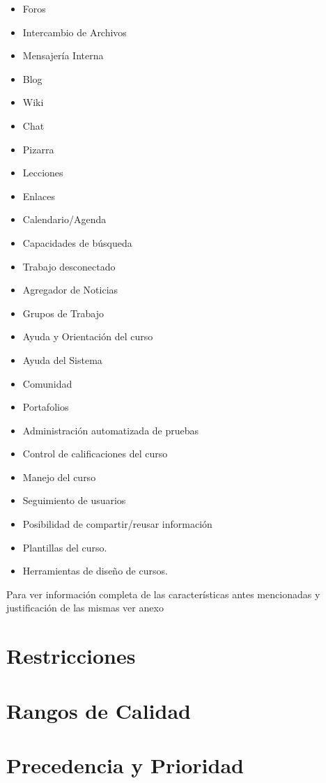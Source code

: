 \documentclass{article}
\begin{document}
\begin{itemize}
\item Foros
\item Intercambio de Archivos
\item Mensajería Interna
\item Blog
\item Wiki
\item Chat
\item Pizarra
\item Lecciones
\item Enlaces
\item Calendario/Agenda
\item Capacidades de búsqueda
\item Trabajo desconectado
\item Agregador de Noticias
\item Grupos de Trabajo
\item Ayuda y Orientación del curso
\item Ayuda del Sistema
\item Comunidad
\item Portafolios
\item Administración automatizada de pruebas
\item Control de calificaciones del curso 
\item Manejo del curso
\item Seguimiento de usuarios
\item Posibilidad de compartir/reusar información
\item Plantillas del curso.
\item Herramientas de diseño de cursos.
\end{itemize}

Para ver información completa de las características antes mencionadas y justificación de las mismas ver anexo 

\section{Restricciones}

\section{Rangos de Calidad}

\section{Precedencia y Prioridad}
\end{document}
